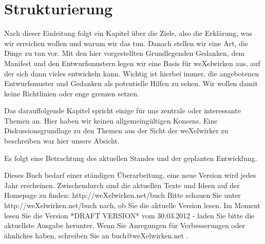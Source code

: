   \section{Strukturierung}
Nach dieser Einleitung folgt ein Kapitel über die Ziele, also die Erklärung, was wir erreichen wollen und warum wir das tun.
%
Danach stellen wir eine Art, die Dinge zu tun vor.
%
Mit den hier vorgestellten Grundlegenden Gedanken, dem Manifest und den Entwurfsmustern legen wir eine Basis für weXelwirken aus, auf der sich dann vieles entwickeln kann.
%
Wichtig ist hierbei immer, die angebotenen Entwurfsmuster und Gedanken als potentielle Hilfen zu sehen. 
%
Wir wollen damit keine Richtlinien oder enge grenzen setzen.



Das darauffolgende Kapitel spricht einige für uns zentrale oder interessante Themen an.
%
Hier haben wir keinen allgemeingültigen Konsens.
%
Eine Diskussionsgrundlage zu den Themen aus der Sicht der weXelwirker zu beschreiben war hier unsere Absicht.



Es folgt eine Betrachtung des aktuellen Standes und der geplanten Entwicklung.



Dieses Buch bedarf einer ständigen Überarbeitung, eine neue Version wird jedes Jahr erscheinen.
%
Zwischendurch sind die aktuellen Texte und Ideen auf der Homepage zu finden: http://weXelwirken.net/buch
%
Bitte schauen Sie unter\\ http://weXelwirken.net/buch nach, ob Sie die aktuelle Version lesen.
%
Im Moment lesen Sie die Version *DRAFT VERSION* vom 30.03.2012 - laden Sie bitte die aktuellste Ausgabe herunter.
%
Wenn Sie Anregungen für Verbesserungen oder ähnliches haben, schreiben Sie an buch@weXelwirken.net .
